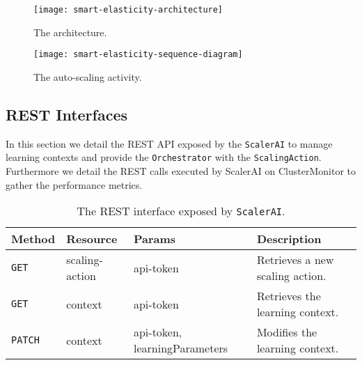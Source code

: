 \begin{figure}	
	\label{fig:smart-elasticity-architecture}
	\centering
	\texttt{[image: smart-elasticity-architecture]}
	\caption{The architecture.}
\end{figure}
\clearpage
\vfill
\begin{landscape}
	\begin{figure}	
		\label{fig:smart-elasticity-sequence-diagram}
		\centering
		\texttt{[image: smart-elasticity-sequence-diagram]}
		\caption{The auto-scaling activity.}
	\end{figure}
\end{landscape}
\vfill
\clearpage


\subsection{REST Interfaces}
\label{sec:smart-elasticity-implementation-rest-interfaces}

In this section we detail the REST API exposed by the \texttt{ScalerAI} to manage learning contexts and provide the \texttt{Orchestrator} with the \texttt{ScalingAction}. 
%
Furthermore we detail the REST calls executed by ScalerAI on ClusterMonitor to gather the performance metrics.

\begin{table}
	\label{tbl:smart-elasticity-rest-scalerai}
	\centering
	\begin{tabular}{| m{1.5cm} | m{3cm} | m{3cm} | m{6cm} | }\hline
		
		\textbf{Method} & \textbf{Resource} & \textbf{Params} & \textbf{Description} \\\hline

		\texttt{GET}	& scaling-action    & api-token & Retrieves a new scaling action. \\\hline

		\texttt{GET}    & context           & api-token & Retrieves the learning context. \\\hline
		
		\texttt{PATCH}  & context           & api-token, learningParameters & Modifies the learning context. \\\hline
		
	\end{tabular}
	\caption{The REST interface exposed by \texttt{ScalerAI}.}
\end{table}

